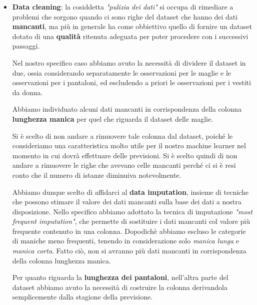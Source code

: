 \documentclass[a4paper, 11pt, oneside]{report}
\begin{document}
                \begin{itemize}
                    \item \textbf{Data cleaning}: la cosiddetta \textit{"pulizia dei dati"} si occupa di
                    rimediare a problemi che sorgono quando ci sono righe del dataset che hanno dei dati \textbf{mancanti}, ma più
                    in generale ha come obbiettivo quello di fornire un dataset dotato di una \textbf{qualità} ritenuta adeguata
                    per poter procedere con i successivi passaggi.
                    \par \noindent Nel nostro specifico caso abbiamo avuto la necessità di dividere il dataset \cite{6} in
                    due, ossia considerando separatamente le osservazioni per le maglie e le osservazioni per i pantaloni,
                    ed escludendo a priori le osservazioni per i vestiti da donna.
                    \par \noindent Abbiamo individuato alcuni dati mancanti in corrispondenza della
                    colonna \textbf{lunghezza manica} per quel che riguarda il dataset delle maglie.
                    \par \noindent Si è scelto di non andare a rimuovere tale colonna dal dataset, poiché le consideriamo una caratteristica
                    molto utile per il nostro machine learner nel momento in cui dovrà effettuare delle previsioni.
                    Si è scelto quindi di non andare a rimuovere le righe che avevano celle mancanti
                    perché ci si è resi conto che il numero di istanze diminuiva notevolmente.
                    \par \noindent Abbiamo dunque scelto di affidarci al \textbf{data imputation}, insieme di tecniche che
                    possono stimare il valore dei dati mancanti sulla base dei dati a nostra disposizione.
                    Nello specifico abbiamo adottato la tecnica di imputazione \textit{"most frequent imputation"}, che permette
                    di sostituire i dati mancanti col valore più frequente contenuto in una colonna. Dopodichè abbiamo
                    escluso le categorie di maniche meno frequenti, tenendo in considerazione solo \textit{manica lunga} e
                    \textit{manica corta}.
                    Fatto ciò, non si avranno più dati mancanti in corrispondenza della colonna lunghezza manica.
                    \par \noindent Per quanto riguarda la \textbf{lunghezza dei pantaloni}, nell'altra parte del
                    dataset abbiamo avuto la necessità di costruire la colonna derivandola semplicemente dalla stagione della previsione.

\end{itemize}
\end{document}
